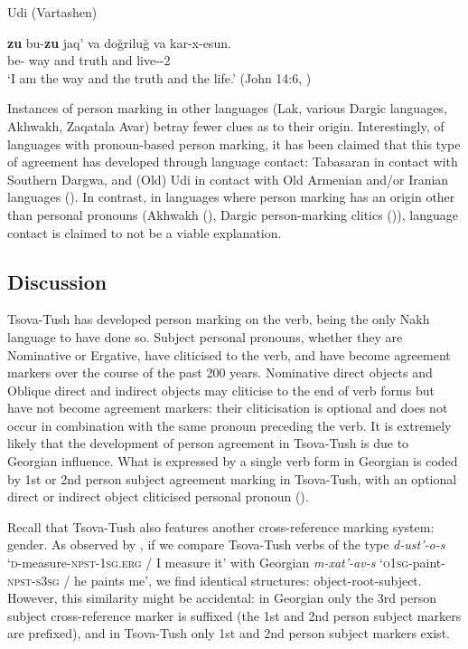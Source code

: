 	\begin{exe}
		\ex\label{verbflex-ex39}
		Udi (Vartashen)
        
		\gll \textbf{zu} bu-\textbf{zu} jaq' va do\u{g}rilu\u{g} va kar-x-esun. \\
		\textbf{{\Fsg}} be-\textbf{{\Fsg}} way and truth and live-{\Lv}-{\Vn}2 \\
		\trans `I am the way and the truth and the life.'
		\hfill (John 14:6, \cites{schulze11})
	\end{exe}




Instances of person marking in other languages (Lak, various Dargic languages, Akhwakh, Zaqatala Avar) betray fewer clues as to their origin. Interestingly, of languages with pronoun-based person marking, it has been claimed that this type of agreement has developed through language contact: Tabasaran in contact with Southern Dargwa, and (Old) Udi in contact with Old Armenian and/or Iranian languages (\cite{schulze11}). In contrast, in languages where person marking has an origin other than personal pronouns (Akhwakh (\cites{creissels08}), Dargic person-marking clitics (\cites{sumbatova11})), language contact is claimed to not be a viable explanation.

\subsection{Discussion}

Tsova-Tush has developed person marking on the verb, being the only Nakh language to have done so. Subject personal pronouns, whether they are Nominative or Ergative, have cliticised to the verb, and have become agreement markers over the course of the past 200 years. Nominative direct objects and Oblique direct and indirect objects may cliticise to the end of verb forms but have not become agreement markers: their cliticisation is optional and does not occur in combination with the same pronoun preceding the verb. It is extremely likely that the development of person agreement in Tsova-Tush is due to Georgian influence. What is expressed by a single verb form in Georgian is coded by 1st or 2nd person subject agreement marking in Tsova-Tush, with an optional direct or indirect object cliticised personal pronoun (\cites{kojima19}).

Recall that Tsova-Tush also features another cross-reference marking system: gender. As observed by \textcite{chrelashvili82}, if we compare Tsova-Tush verbs of the type \textit{d-ust'-o-s} `\textsc{d}-measure-\textsc{npst-1sg.erg} / I measure it' with Georgian \textit{m-xat'-av-s} `\textsc{o1sg}-paint-\textsc{npst-s3sg} / he paints me', we find identical structures: object-root-subject. However, this similarity might be accidental: in Georgian only the 3rd person subject cross-reference marker is suffixed (the 1st and 2nd person subject markers are prefixed), and in Tsova-Tush only 1st and 2nd person subject markers exist. 

